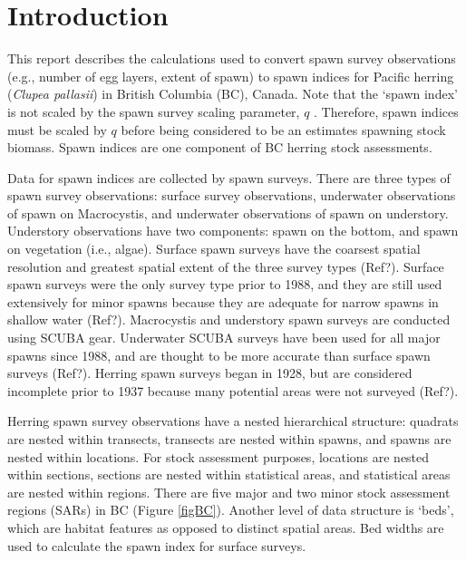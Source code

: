 \documentclass[12pt]{article}
\begin{document}

\tableofcontents \clearpage  %

\thispagestyle{empty}  %


\section{Introduction}

This report describes the calculations used to convert spawn survey observations (e.g., number of egg layers, extent of spawn) to spawn indices for Pacific herring (\!\emph{Clupea pallasii}) in British Columbia (BC), Canada.
Note that the `spawn index' is not scaled by the spawn survey scaling parameter, $q$ \citeyearpar[CSAS][]{CSAS2015b}.
Therefore, spawn indices must be scaled by $q$ before being considered to be an estimates spawning stock biomass.
Spawn indices are one component of BC herring stock assessments.

Data for spawn indices are collected by spawn surveys.
There are three types of spawn survey observations: surface survey observations, underwater observations of spawn on Macrocystis, and underwater observations of spawn on understory.
Understory observations have two components: spawn on the bottom, and spawn on vegetation (i.e., algae).
Surface spawn surveys have the coarsest spatial resolution and greatest spatial extent of the three survey types (Ref?).
Surface spawn surveys were the only survey type prior to 1988, and they are still used extensively for minor spawns because they are adequate for narrow spawns in shallow water (Ref?).
Macrocystis and understory spawn surveys are conducted using SCUBA gear.
Underwater SCUBA surveys have been used for all major spawns since 1988, and are thought to be more accurate than surface spawn surveys (Ref?).
Herring spawn surveys began in 1928, but are considered incomplete prior to 1937 because many potential areas were not surveyed (Ref?).

Herring spawn survey observations have a nested hierarchical structure: quadrats are nested within transects, transects are nested within spawns, and spawns are nested within locations.
For stock assessment purposes, locations are nested within sections, sections are nested within statistical areas, and statistical areas are nested within regions.
There are five major and two minor stock assessment regions (SARs) in BC (Figure \ref{figBC}).
Another level of data structure is `beds', which are habitat features as opposed to distinct spatial areas.
Bed widths are used to calculate the spawn index for surface surveys.
\end{document}
